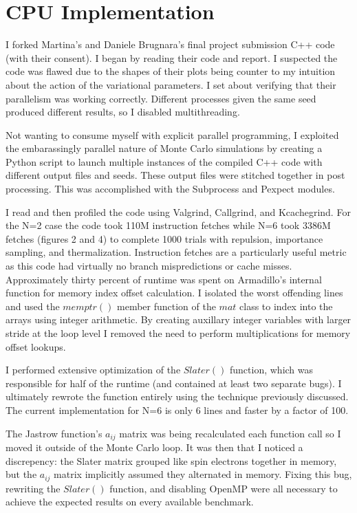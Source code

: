 \documentclass[11pt, conference, compsocconf]{IEEEtran}
\begin{document}
\section{CPU Implementation}
I forked Martina's and Daniele Brugnara's final project submission C++ code (with their consent). I began by reading their code and report. I suspected the code was flawed due to the shapes of their plots being counter to my intuition about the action of the variational parameters. I set about verifying that their parallelism was working correctly. Different processes given the same seed produced different results, so I disabled multithreading.

Not wanting to consume myself with explicit parallel programming, I exploited the embarassingly parallel nature of Monte Carlo simulations by creating a Python script to launch multiple instances of the compiled C++ code with different output files and seeds. These output files were stitched together in post processing. This was accomplished with the Subprocess and Pexpect modules. 

I read and then profiled the code using Valgrind, Callgrind, and Kcachegrind. For the N=2 case the code took 110M instruction fetches while N=6 took 3386M fetches (figures 2 and 4) to complete 1000 trials with repulsion, importance sampling, and thermalization. Instruction fetches are a particularly useful metric as this code had virtually no branch mispredictions or cache misses. Approximately thirty percent of runtime was spent on Armadillo's internal function for memory index offset calculation. I isolated the worst offending lines and used the $memptr()$ member function of the $mat$ class to index into the arrays using integer arithmetic. By creating auxillary integer variables with larger stride at the loop level I removed the need to perform multiplications for memory offset lookups. 

I performed extensive optimization of the $Slater()$ function, which was responsible for half of the runtime (and contained at least two separate bugs). I ultimately rewrote the function entirely using the technique previously discussed. The current implementation for N=6 is only 6 lines and faster by a factor of 100. 

The Jastrow function's $a_{ij}$ matrix was being recalculated each function call so I moved it outside of the Monte Carlo loop. It was then that I noticed a discrepency: the Slater matrix grouped like spin electrons together in memory, but the $a_{ij}$ matrix implicitly assumed they alternated in memory. Fixing this bug, rewriting the $Slater()$ function, and disabling OpenMP were all necessary to achieve the expected results on every available benchmark.
\end{document}
